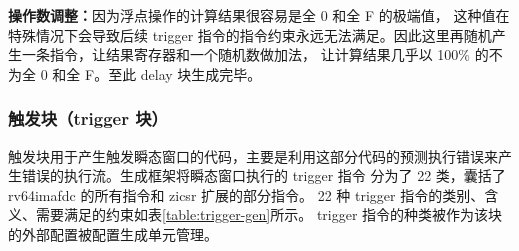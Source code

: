 \textbf{操作数调整：}因为浮点操作的计算结果很容易是全 0 和全 F 的极端值，
这种值在特殊情况下会导致后续 trigger 指令的指令约束永远无法满足。因此这里再随机产生一条指令，让结果寄存器和一个随机数做加法，
让计算结果几乎以 100\% 的不为全 0 和全 F。至此 delay 块生成完毕。\par

\subsubsection{触发块（trigger 块）}
触发块用于产生触发瞬态窗口的代码，主要是利用这部分代码的预测执行错误来产生错误的执行流。生成框架将瞬态窗口执行的 trigger 指令
分为了 22 类，囊括了 rv64imafdc 的所有指令和 zicsr 扩展的部分指令。
22 种 trigger 指令的类别、含义、需要满足的约束如表\ref{table:trigger-gen}所示。
trigger 指令的种类被作为该块的外部配置被配置生成单元管理。\par

